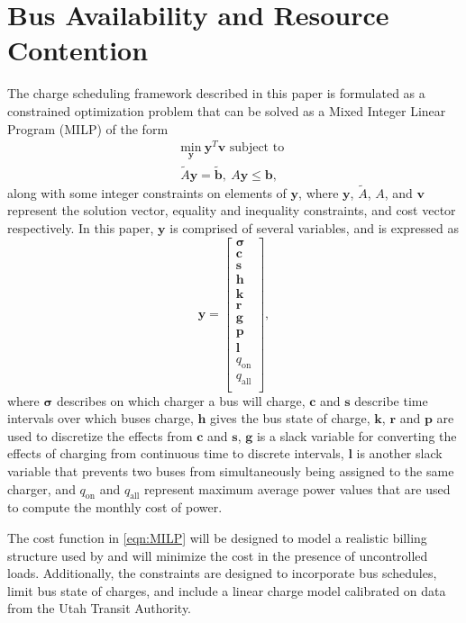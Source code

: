 \section{Bus Availability and Resource Contention\label{sec:4_formulation}}
The charge scheduling framework described in this paper is formulated as a constrained optimization problem that can be solved as a Mixed Integer Linear Program (MILP) of the form
\begin{equation}\label{eqn:MILP}\begin{matrix}
	\underset{\mathbf{y}}{\text{min}} \ \mathbf{y}^T\mathbf{v} \text{ subject to } \\
	\tilde{A}\mathbf{y} = \tilde{\mathbf{b}}, \ A\mathbf{y} \le \mathbf{b},
\end{matrix} \end{equation}
along with some integer constraints on elements of $\mathbf{y}$,
where $\mathbf{y}$, $\tilde{A}$, $A$, and $\mathbf{v}$ represent the solution vector, equality and inequality constraints, and cost vector respectively. In this paper, $\mathbf{y}$ is comprised of several variables, and is expressed as 
\begin{equation}\label{eqn:yDef}
	\mathbf{y} = \begin{bmatrix}
			\boldsymbol{\sigma} \\ 
			\mathbf{c}      \\ 
			\mathbf{s}      \\ 
			\mathbf{h}      \\ 
			\mathbf{k}      \\ 
			\mathbf{r}      \\ 
			\mathbf{g}      \\
			\mathbf{p}      \\ 
			\mathbf{l}      \\
			q_{\text{on}}   \\ 
			q_{\text{all}}  \\
		     \end{bmatrix},
\end{equation}
where $\boldsymbol{\sigma}$ describes on which charger a bus will charge, $\mathbf{c}$ and $\mathbf{s}$ describe time intervals over which buses charge, $\mathbf{h}$ gives the bus state of charge, $\mathbf{k}$, $\mathbf{r}$ and $\mathbf{p}$ are used to discretize the effects from $\mathbf{c}$ and $\mathbf{s}$, $\mathbf{g}$ is a slack variable for converting the effects of charging from continuous time to discrete intervals, $\mathbf{l}$ is another slack variable that prevents two buses from simultaneously being assigned to the same charger, and $q_{\text{on}}$ and $q_{\text{all}}$ represent maximum average power values that are used to compute the monthly cost of power. 
\par The cost function in \eqref{eqn:MILP} will be designed to model a realistic billing structure used by \cite{rocky_mountain_power_rocky_2021} and will minimize the cost in the presence of uncontrolled loads. Additionally, the constraints are designed to incorporate bus schedules, limit bus state of charges, and include a linear charge model calibrated on data from the Utah Transit Authority.

